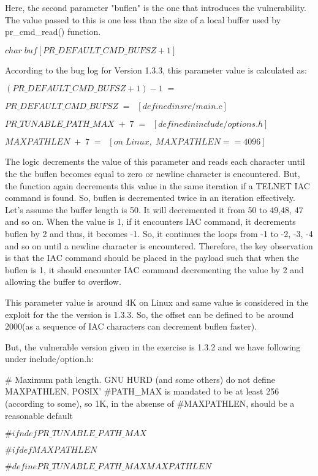 \documentclass[11pt, pdftex]{article}
\begin{document}
\begin{enumerate}
\begin{itemize}
Here, the second parameter "buflen" is the one that introduces the vulnerability. The value passed to this is one less than the size of a local buffer used by pr\_cmd\_read() function.

	\centerline {$char\; buf[PR\_DEFAULT\_CMD\_BUFSZ+1]$}
	
	
According to the bug log for Version 1.3.3, this parameter value is calculated as:


  $(PR\_DEFAULT\_CMD\_BUFSZ+1)-1\; =\;$  
  
  $PR\_DEFAULT\_CMD\_BUFSZ\; =\;\;          [defined in src/main.c]$  
  
  $PR\_TUNABLE\_PATH\_MAX\; +\; 7\; =\;\;       [defined in include/options.h]$
  
  $MAXPATHLEN\; +\; 7\; =\;\;            [on\; Linux,\; MAXPATHLEN==4096]$

The logic decrements the value of this parameter and reads each character until the the buflen becomes equal to zero or newline character is encountered.
But, the function again decrements this value in the same iteration if a TELNET IAC command is found. So, buflen is decremented twice in an iteration effectively. Let's assume the buffer length is 50. It will decremented it from 50 to 49,48, 47 and so on. 
When the value is 1, if it encounters IAC command, it decrements buflen by 2 and thus, it becomes -1. So, it continues the loops from -1 to -2, -3, -4 and so on until a newline character is encountered. Therefore, the key observation is that the IAC command should be placed in the payload such that when the buflen is 1, it should encounter IAC command decrementing the value by 2 and allowing the buffer to overflow.    
  
 This parameter value is around 4K on Linux and same value is considered in the exploit for the the version is 1.3.3. So, the offset can be defined to be around 2000(as a sequence of IAC characters can decrement buflen faster).

But, the vulnerable version given in the exercise is 1.3.2 and we have following under include/option.h:

\# Maximum path length.  GNU HURD (and some others) do not define MAXPATHLEN.  POSIX' \#PATH\_MAX is mandated to be at least 256 (according to some), so 1K, in the absense of \#MAXPATHLEN, should be a reasonable default

$\#ifndef PR\_TUNABLE\_PATH\_MAX$

$\# ifdef MAXPATHLEN$

$\#  define PR\_TUNABLE\_PATH\_MAX           MAXPATHLEN$


\end{itemize}
\end{enumerate}
\end{document}
